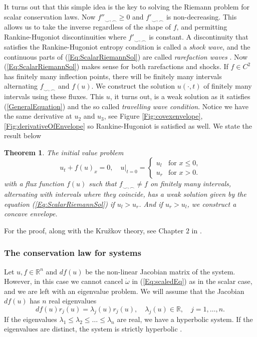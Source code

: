 \documentclass[10pt]{article}
\newtheorem{theorem}{Theorem}[section]
\numberwithin{equation}{section}
\begin{document}
 It turns out that this simple idea is the key to solving the Riemann problem for scalar conservation laws. Now $f''_{\smile, \frown} \geq 0$ and $f'_{\smile, \frown} $ is non-decreasing. This allows us to take the inverse regardless of the shape of $f$, and permitting Rankine-Hugoniot discontinuities where $f'_{\smile, \frown} $ is constant. A discontinuity that satisfies the Rankine-Hugoniot entropy condition is called a \textit{shock wave}, and the continuous parts of (\ref{Eq:ScalarRiemannSol}) are called \textit{rarefaction waves} \cite{HoldenH.Helge2015Ftfh}. Now (\ref{Eq:ScalarRiemannSol}) makes sense for both rarefactions and shocks. If $f \in C^2$ has finitely many inflection points, there will be finitely many intervals alternating $f_{\smile, \frown} $ and $f(u)$. We construct the solution $u(\cdot, t)$ of finitely many intervals using these fluxes. This $u$, it turns out, is a weak solution as it satisfies (\ref{GeneralEquation}) and the so called \textit{travelling wave condition}. Notice we have the same derivative at $u_2$ and $u_3$, see Figure \ref{Fig:covexenvelope}, \ref{Fig:derivativeOfEnvelope} so Rankine-Hugoniot is satisfied as well. We state the result below
\begin{theorem}
The initial value problem
\begin{equation*}
    u_t + f(u)_x = 0,  \quad u|_{t = 0 } = \begin{cases} u_l & \text{for $x \leq 0$,}\\ u_r & \text{for $x>0$.} 
 \end{cases}
\end{equation*}
 with a flux function $f(u)$ such that $f_{\smile,\frown} \neq f$ on finitely many intervals, alternating with intervals where they coincide, has a weak solution given by the equation (\ref{Eq:ScalarRiemannSol}) if $u_l > u_r$. And if $u_r > u_l$, we construct a concave envelope.  
\label{RP_Kruzkov_sol}
\end{theorem} For the proof, along with the Kružkov theory, see Chapter $2$ in \cite{HoldenH.Helge2015Ftfh}.



\subsubsection{The conservation law for systems }
Let $u, f \in \mathbb{R}^n$ and  $ df(u)$ be the non-linear Jacobian matrix of the system. However, in this case we cannot cancel $ \dot \omega$ in (\ref{Eq:scaledEq}) as in the scalar case, and we are left with an eigenvalue problem. We will assume that the Jacobian $df(u)$ has $n$ real eigenvalues 
\begin{equation}
    df(u)r_j(u) = \lambda_j(u)r_j(u), \quad \lambda_j(u) \in \mathbb{R}, \quad j = 1, \dots, n. 
    \label{Eq:Eig.val problem}
\end{equation}
If the eigenvalues $\lambda_1 \leq \lambda_2 \leq \dots \leq \lambda_n $ are real, we have a hyperbolic system. If the eigenvalues are distinct, the system is strictly hyperbolic \cite{HoldenH.Helge2015Ftfh}. 
\end{document}
